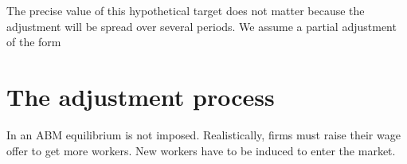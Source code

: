 The precise value of this hypothetical target does not matter because the adjustment will be spread over several periods. We assume a partial adjustment of the form


























\section{The adjustment process}
In an ABM equilibrium is not imposed. Realistically, firms must raise their wage offer to get more workers. New workers have to be induced to enter the market. %

